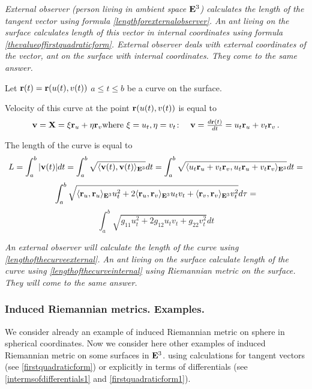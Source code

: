 \documentclass[12pt]{article}
\theoremstyle{theorem}
\numberwithin{equation}{section}
\begin{document}
{\it External observer (person living in ambient space ${\bf E}^3$) calculates
 the length
of the tangent vector  using formula
\eqref{lengthforexternalobserver}. An ant living on the surface
calculates length of this vector in internal coordinates using formula
\eqref{thevalueoffirstquadraticform}. External observer deals
with external coordinates of the vector, ant on the surface 
with internal coordinates.
 They come to the same answer.}


\smallskip



  Let ${\bf r}(t)={\bf r}(u(t),v(t))$ $a\leq t\leq b$ be a curve on the surface.


  Velocity of this curve at the  point ${\bf r}(u(t),v(t))$ is equal to
  $$
  {\bf v}={\bf X}=\xi {\bf r}_u+\eta{\bf r}_v
  \hbox
  {where
  $\xi=u_t,\eta=v_t\colon\quad {\bf v}={d{\bf r}(t)\over dt}=
    u_t{\bf r}_u+v_t{\bf r}_v$}
  \,.
  $$


The length of the curve is equal to
\begin{equation}\label{lengthofthecurveexternal}
L=\int_a^b |{\bf v}(t)|d t= \int_a^b\sqrt
{\langle {\bf v}(t),{\bf v}(t)\rangle_{{\bf E}^3}}d t = \int_a^b\sqrt
{\langle u_t{\bf r}_u+v_t{\bf r}_v,u_t{\bf r}_u+v_t{\bf r}_v\rangle_{{\bf E}^3}}dt=
\end{equation}
           $$
\int_a^b\sqrt {\langle{\bf r}_u,{\bf r}_u\rangle_{{\bf E}^3}u_t^2+2\langle{\bf r}_u,{\bf r}_v\rangle_{{\bf E}^3}u_tv_t+\langle{\bf r}_v,{\bf r}_v\rangle_{{\bf E}^3}v_t^2}d\tau=
           $$
\begin{equation}\label{lengthofthecurveinternal}
  \int_a^b\sqrt {g_{11} u_t^2+2g_{12}u_tv_t+g_{22}v_t^2}dt
\end{equation}

{\it An external observer will calculate the length of the curve using
\eqref{lengthofthecurveexternal}.  An ant living on the surface calculate
length of the curve using
\eqref{lengthofthecurveinternal} using  Riemannian
metric on the surface. They will come to the same answer.}



\subsubsection{Induced Riemannian metrics. Examples.}
We consider already an example of induced Riemannian
metric on sphere in spherical coordinates.
Now 
we consider here other
examples of induced Riemannian metric
on some surfaces in ${\bf E}^3$.
using calculations for tangent vectors (see \eqref{firstquadraticform}) or
explicitly in terms of differentials (see \eqref{intermsofdifferentials1} and \eqref{firstquadraticform1}).
\end{document}
